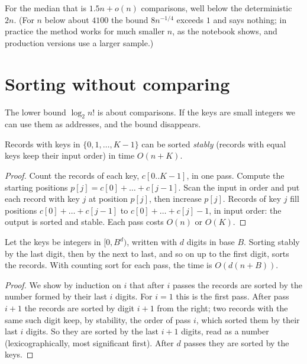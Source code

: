 For the median that is $1.5n+o(n)$ comparisons, well below the deterministic $2n$. (For $n$ below about $4100$ the bound $8n^{-1/4}$ exceeds $1$ and says nothing;
in practice the method works for much smaller $n$, as the notebook shows, and production versions use a larger sample.)

\section{Sorting without comparing}\label{sec:radix}

The lower bound $\log_2n!$ is about comparisons. If the keys are small integers we can use them as addresses, and the bound disappears.

\begin{proposition}\label{prop:counting}
Records with keys in $\{0,1,\dots,K-1\}$ can be sorted \emph{stably} (records with equal keys keep their input order) in time $O(n+K)$.
\end{proposition}
\begin{proof}
Count the records of each key, $c[0..K-1]$, in one pass. Compute the starting positions $p[j]=c[0]+\dots+c[j-1]$. Scan the input in order and put each record with key $j$
at position $p[j]$, then increase $p[j]$. Records of key $j$ fill positions $c[0]+\dots+c[j-1]$ to $c[0]+\dots+c[j]-1$, in input order: the output is sorted and stable. Each pass costs
$O(n)$ or $O(K)$.
\end{proof}

\begin{theorem}\label{thm:radix}
Let the keys be integers in $[0,B^d)$, written with $d$ digits in base $B$. Sorting stably by the last digit, then by the next to last, and so on up to the first digit,
sorts the records. With counting sort for each pass, the time is $O(d(n+B))$.
\end{theorem}
\begin{proof}
We show by induction on $i$ that after $i$ passes the records are sorted by the number formed by their last $i$ digits. For $i=1$ this is the first pass. After pass $i+1$
the records are sorted by digit $i+1$ from the right; two records with the same such digit keep, by stability, the order of pass $i$, which sorted them by their last $i$ digits.
So they are sorted by the last $i+1$ digits, read as a number (lexicographically, most significant first). After $d$ passes they are sorted by the keys.
\end{proof}

